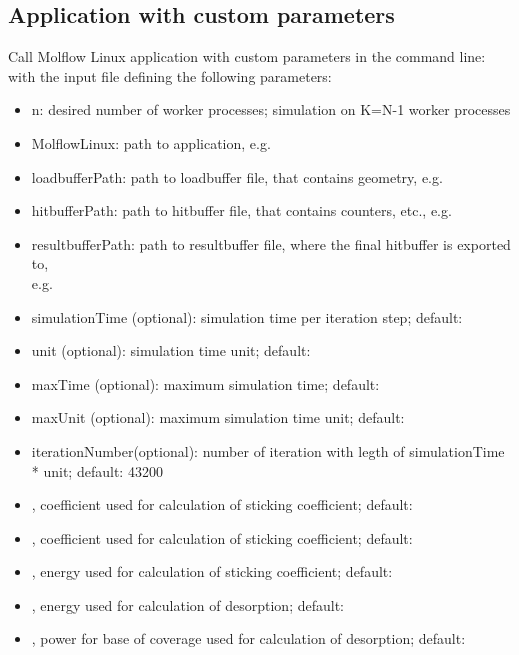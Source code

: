 \subsection{Application with custom parameters}
Call Molflow Linux application with custom parameters in the command line:
\smallskip
with the input file defining the following parameters:
\begin{itemize}[noitemsep,topsep=0pt]
\item n: desired number of worker processes; simulation on K=N-1 worker processes
\item MolflowLinux: path to application, e.g.\ 
\item loadbufferPath: path to loadbuffer file, that contains geometry, e.g.\ 
\item hitbufferPath: path to hitbuffer file, that contains counters, etc., e.g.\ 
\item resultbufferPath: path to resultbuffer file, where the final hitbuffer is exported to,\\ e.g.\ 
\item simulationTime (optional): simulation time per iteration step; default: 
\item unit (optional): simulation time unit; default: 
\item maxTime (optional): maximum simulation time; default: 
\item maxUnit (optional): maximum simulation time unit; default: 
\item iterationNumber(optional): number of iteration with legth of simulationTime * unit; default: 43200
\item {}, coefficient used for calculation of sticking coefficient; default:
\item {}, coefficient used for calculation of sticking coefficient; default:
\item {}, energy used for calculation of sticking coefficient; default:
\item {}, energy used for calculation of desorption; default:
\item{}, power for base of coverage used for calculation of desorption; default:
\end{itemize}


